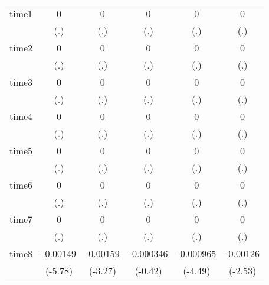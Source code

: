 \begin{table}[htbp]
\begin{tabular}{l*{5}{c}}
time1       &           0         &           0         &           0         &           0         &           0         \\
            &         (.)         &         (.)         &         (.)         &         (.)         &         (.)         \\
time2       &           0         &           0         &           0         &           0         &           0         \\
            &         (.)         &         (.)         &         (.)         &         (.)         &         (.)         \\
time3       &           0         &           0         &           0         &           0         &           0         \\
            &         (.)         &         (.)         &         (.)         &         (.)         &         (.)         \\
time4       &           0         &           0         &           0         &           0         &           0         \\
            &         (.)         &         (.)         &         (.)         &         (.)         &         (.)         \\
time5       &           0         &           0         &           0         &           0         &           0         \\
            &         (.)         &         (.)         &         (.)         &         (.)         &         (.)         \\
time6       &           0         &           0         &           0         &           0         &           0         \\
            &         (.)         &         (.)         &         (.)         &         (.)         &         (.)         \\
time7       &           0         &           0         &           0         &           0         &           0         \\
            &         (.)         &         (.)         &         (.)         &         (.)         &         (.)         \\
time8       &    -0.00149\sym{***}&    -0.00159\sym{**} &   -0.000346         &   -0.000965\sym{***}&    -0.00126\sym{*}  \\
            &     (-5.78)         &     (-3.27)         &     (-0.42)         &     (-4.49)         &     (-2.53)         \\

\end{tabular}
\end{table}
